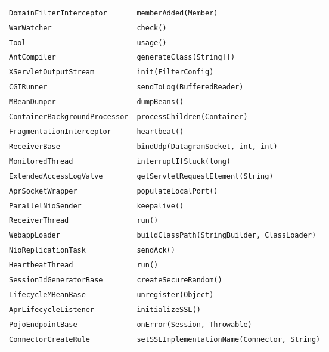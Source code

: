 \begin{center}
\begin{longtable}{ll}
 \lstinline/DomainFilterInterceptor/&{\lstinline/memberAdded(Member)/}\\
 \lstinline/WarWatcher/&{\lstinline/check()/}\\
 \lstinline/Tool/&{\lstinline/usage()/}\\
 \lstinline/AntCompiler/&{\lstinline/generateClass(String[])/}\\
 \lstinline/XServletOutputStream/&{\hspace*{-2pt}\lstinline/init(FilterConfig)/}\\
 \lstinline/CGIRunner/&{\lstinline/sendToLog(BufferedReader)/}\\
 \lstinline/MBeanDumper/&{\lstinline/dumpBeans()/}\\
 \lstinline/ContainerBackgroundProcessor/&{\lstinline/processChildren(Container)/}\\
 \lstinline/FragmentationInterceptor/&{\lstinline/heartbeat()/}\\
 \lstinline/ReceiverBase/&{\lstinline/bindUdp(DatagramSocket, int, int)/}\\
 \lstinline/MonitoredThread/&{\hspace*{-2pt}\lstinline/interruptIfStuck(long)/}\\
 \lstinline/ExtendedAccessLogValve/&{\lstinline/getServletRequestElement(String)/}\\
 \lstinline/AprSocketWrapper/&{\lstinline/populateLocalPort()/}\\
 \lstinline/ParallelNioSender/&{\lstinline/keepalive()/}\\
 \lstinline/ReceiverThread/&{\lstinline/run()/}\\
 \lstinline/WebappLoader/&{\lstinline/buildClassPath(StringBuilder, ClassLoader)/}\\
 \lstinline/NioReplicationTask/&{\lstinline/sendAck()/}\\
 \lstinline/HeartbeatThread/&{\lstinline/run()/}\\
 \lstinline/SessionIdGeneratorBase/&{\lstinline/createSecureRandom()/}\\
 \lstinline/LifecycleMBeanBase/&{\lstinline/unregister(Object)/}\\
 \lstinline/AprLifecycleListener/&{\hspace*{-2pt}\lstinline/initializeSSL()/}\\
 \lstinline/PojoEndpointBase/&{\lstinline/onError(Session, Throwable)/}\\
 \lstinline/ConnectorCreateRule/&{\lstinline/setSSLImplementationName(Connector, String)/}\\

\end{longtable}
\end{center}
